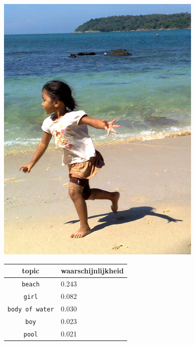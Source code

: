 \begin{figure}[!htb]
    \centering
    \begin{minipage}[t]{.5\linewidth}
    \centering
    \vspace{0pt}
    \includegraphics[width=\textwidth]{Images/LDA/3107059919.jpg}
    \end{minipage}\hfill
    \begin{minipage}[t]{.5\textwidth}
    \centering
    \vspace{0pt}
    \begin{tabular}{cl}
            topic                           & waarschijnlijkheid\\
            \hline
            \texttt{beach}             & 0.243 \\
            \texttt{girl}                   & 0.082 \\
            \texttt{body of water}                 & 0.030 \\
            \texttt{boy}           & 0.023 \\
            \texttt{pool}        & 0.021\\
            \hline
        \end{tabular}
    \end{minipage}
\end{figure}


